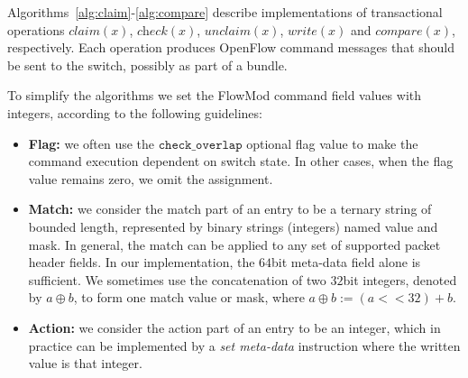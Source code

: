 \documentclass[conference]{sigcomm-alternate}
\newcommand{\hide}[1]{}
\newcommand{\concat}[0]{\oplus}
\newcommand{\claimcheck}{check\xspace}
\newcommand{\compare}{compare\xspace}
\newcommand{\checko}{\texttt{check\_overlap}\xspace}
\newcommand{\liron}[1]{\textit{\textcolor{mygreen}{[liron]: #1}}} %
\newcommand{\petr}[1]{\textit{\textcolor{blue}{[petr]: #1}}} %
\begin{document}
Algorithms~\ref{alg:claim}-\ref{alg:compare} describe implementations of
transactional operations  $\textit{claim}(x)$, $\textit{\claimcheck}(x)$,
$\textit{unclaim}(x)$, $\textit{write}(x)$ and $\textit{\compare}(x)$, respectively.
Each operation produces OpenFlow command messages that should be sent to the switch, possibly as part of a bundle. 
\hide{ 
We describe each operation as a message factory \petr{did not get what is "message factory"} that returns OpenFlow commands which
should be sent to the switch as part of the same transaction.
We assume that every transaction has a unique identifier and is used to start a \emph{bundle}.
All messages generated during a transaction invocation, are wrapped by bundle messages carrying
the bundle's ID and followed by bundle commit message.
Messages with same bundle ID are considered to belong to same bundle and are performed atomically.
\liron{I don't think we need all of this bundle staff here. we need to move it to next sextion - policy updates}
}

To simplify the algorithms we set the FlowMod command field values with integers, according to the following guidelines:
\begin{itemize}

\item {\bf  Flag:} we often use the $\checko$ optional flag value to make the command execution dependent on switch state. In other cases, when the flag value remains zero, we omit the assignment.

\item {\bf  Match:} we consider the match part of an entry to be a ternary string of bounded length, represented by binary strings (integers) named value and mask. In general, the match can be applied to any set of supported packet header fields. In our implementation, the $64$bit meta-data field alone is sufficient. We sometimes use the concatenation of two $32$bit integers, denoted by $a\concat b$, to form one match value or mask, where $a\concat b := (a<<32)+b$.

\item {\bf Action:} we consider the action part of an entry to be an integer, which in practice can be implemented by a \emph{set meta-data} instruction where the written value is that integer.

\end{itemize} 
\end{document}
